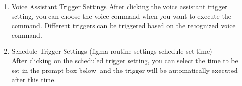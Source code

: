 \begin{enumerate}[label=\arabic*.]
\begin{enumerate}[label*={\arabic*.},ref=\theenumi.\arabic*]
\begin{enumerate}[label*={\arabic*.},ref=\theenumi.\arabic*]
                        \item  Voice Assistant Trigger Settings
                              After clicking the voice assistant trigger setting, you can choose the voice command when you want to execute the command. Different triggers can be triggered based on the recognized voice command.\\
                        \item  Schedule Trigger Settings
                    (figma-routine-settings-schedule-set-time)\\
                              After clicking on the scheduled trigger setting, you can select the time to be set in the prompt box below, and the trigger will be automatically executed after this time.\\
                    \end{enumerate}
          \end{enumerate}


\end{enumerate}

